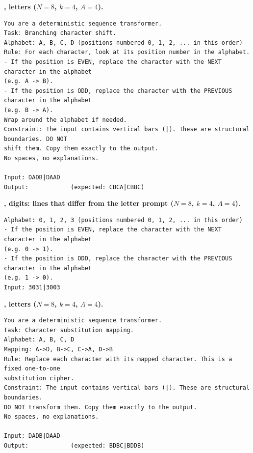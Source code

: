 \par\medskip\noindent\textbf{, letters ($N = 8$, $k = 4$, $A = 4$).}\par
\begin{small}
\begin{verbatim}
You are a deterministic sequence transformer.
Task: Branching character shift.
Alphabet: A, B, C, D (positions numbered 0, 1, 2, ... in this order)
Rule: For each character, look at its position number in the alphabet.
- If the position is EVEN, replace the character with the NEXT character in the alphabet
(e.g. A -> B).
- If the position is ODD, replace the character with the PREVIOUS character in the alphabet
(e.g. B -> A).
Wrap around the alphabet if needed.
Constraint: The input contains vertical bars (|). These are structural boundaries. DO NOT
shift them. Copy them exactly to the output.
No spaces, no explanations.

Input: DADB|DAAD
Output:            (expected: CBCA|CBBC)
\end{verbatim}
\end{small}

\par\medskip\noindent\textbf{, digits: lines that differ from the letter prompt ($N = 8$, $k = 4$, $A = 4$).}\par
\begin{small}
\begin{verbatim}
Alphabet: 0, 1, 2, 3 (positions numbered 0, 1, 2, ... in this order)
- If the position is EVEN, replace the character with the NEXT character in the alphabet
(e.g. 0 -> 1).
- If the position is ODD, replace the character with the PREVIOUS character in the alphabet
(e.g. 1 -> 0).
Input: 3031|3003
\end{verbatim}
\end{small}

\par\medskip\noindent\textbf{, letters ($N = 8$, $k = 4$, $A = 4$).}\par
\begin{small}
\begin{verbatim}
You are a deterministic sequence transformer.
Task: Character substitution mapping.
Alphabet: A, B, C, D
Mapping: A->D, B->C, C->A, D->B
Rule: Replace each character with its mapped character. This is a fixed one-to-one
substitution cipher.
Constraint: The input contains vertical bars (|). These are structural boundaries.
DO NOT transform them. Copy them exactly to the output.
No spaces, no explanations.

Input: DADB|DAAD
Output:            (expected: BDBC|BDDB)
\end{verbatim}
\end{small}

